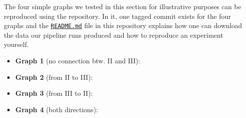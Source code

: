 \begin{tcolorbox}[
    title=\faIcon{recycle} Reproducibility,
    parbox=false,
    float
]
    The four simple graphs we tested in this section for illustrative purposes can be reproduced using the  repository. In it, one tagged commit exists for the four graphs and the \href{https://github.com/rmnldwg/lynference#readme}{ \texttt{README.md}} file in this repository explains how one can download the data our pipeline runs produced and how to reproduce an experiment yourself.

    \begin{itemize}
        \item \textbf{Graph 1} (no connection btw. II and III): 
        \item \textbf{Graph 2} (from II to III): 
        \item \textbf{Graph 3} (from III to II): 
        \item \textbf{Graph 4} (both directions): 
    \end{itemize}
\end{tcolorbox}
